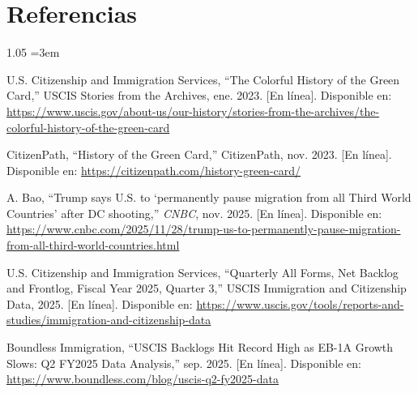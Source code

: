 \documentclass[12pt,letterpaper]{report}
\begin{document}
\clearpage

\chapter{Referencias}

\begin{spacing}{1.05}
\footnotesize
\sloppy
{}
\emergencystretch=3em
\begin{enumerate}[label={[\arabic*]}, leftmargin=0.9cm, labelsep=0.3cm, itemsep=4pt, parsep=0pt, topsep=0pt]

    \item \label{bib:1} U.S. Citizenship and Immigration Services, ``The Colorful History of the Green Card,'' USCIS Stories from the Archives, ene. 2023. [En línea]. Disponible en: \url{https://www.uscis.gov/about-us/our-history/stories-from-the-archives/the-colorful-history-of-the-green-card}

    \item \label{bib:2} CitizenPath, ``History of the Green Card,'' CitizenPath, nov. 2023. [En línea]. Disponible en: \url{https://citizenpath.com/history-green-card/}

    \item \label{bib:3} A. Bao, ``Trump says U.S. to `permanently pause migration from all Third World Countries' after DC shooting,'' \textit{CNBC}, nov. 2025. [En línea]. Disponible en: \url{https://www.cnbc.com/2025/11/28/trump-us-to-permanently-pause-migration-from-all-third-world-countries.html}

    \item \label{bib:4} U.S. Citizenship and Immigration Services, ``Quarterly All Forms, Net Backlog and Frontlog, Fiscal Year 2025, Quarter 3,'' USCIS Immigration and Citizenship Data, 2025. [En línea]. Disponible en: \url{https://www.uscis.gov/tools/reports-and-studies/immigration-and-citizenship-data}

    \item \label{bib:5} Boundless Immigration, ``USCIS Backlogs Hit Record High as EB-1A Growth Slows: Q2 FY2025 Data Analysis,'' sep. 2025. [En línea]. Disponible en: \url{https://www.boundless.com/blog/uscis-q2-fy2025-data}


\end{enumerate}
\end{spacing}
\end{document}
